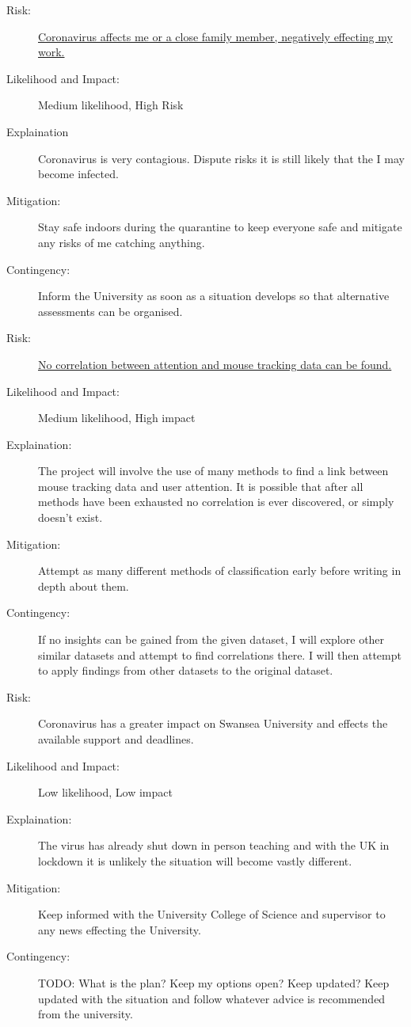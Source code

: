\documentclass{article}
\begin{document}
\begin{description}
    \item[Risk:]
    \underline{Coronavirus affects me or a close family member, negatively effecting my work.}
    \item[Likelihood and Impact:]
    Medium likelihood, High Risk
    \item[Explaination]
    Coronavirus is very contagious. 
    Dispute risks it is still likely that the I may become infected. 
    \item[Mitigation:]
    Stay safe indoors during the quarantine to keep everyone safe and mitigate any risks of me catching anything.
    \item[Contingency:]
    Inform the University as soon as a situation develops so that alternative assessments can be organised.
\end{description}


\begin{description}
    \item[Risk:]    
    \underline{No correlation between attention and mouse tracking data can be found.}    
    \item[Likelihood and Impact:]
    Medium likelihood, High impact
    \item[Explaination:]
    The project will involve the use of many methods to find a link between mouse tracking data and user attention.
    It is possible that after all methods have been exhausted no correlation is ever discovered, or simply doesn't exist. 
    \item[Mitigation:]
    Attempt as many different methods of classification early before writing in depth about them.  
    \item[Contingency:]
    If no insights can be gained from the given dataset, I will explore other similar datasets and attempt to find correlations there.
    I will then attempt to apply findings from other datasets to the original dataset. 
\end{description}

\begin{description}
    \item[Risk:]    
    Coronavirus has a greater impact on Swansea University and  effects the available support and deadlines.
    \item[Likelihood and Impact:]
    Low likelihood, Low impact
    \item[Explaination:]
    The virus has already shut down in person teaching and with the UK in lockdown it is unlikely the situation will become vastly different. 
    \item[Mitigation:]
    Keep informed with the University College of Science and supervisor to any news effecting the University.
    \item[Contingency:]
    TODO: What is the plan? Keep my options open? Keep updated?
    Keep updated with the situation and follow whatever advice is recommended from the university.
\end{description}
\end{document}
